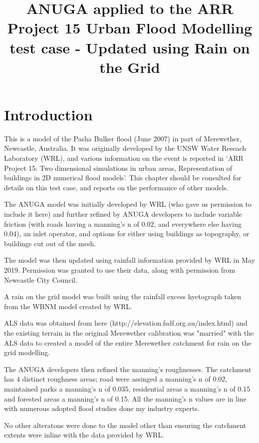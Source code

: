\documentclass{article}
\begin{document}
\title{ANUGA applied to the ARR Project 15 Urban Flood Modelling test case 
- Updated using Rain on the Grid}

\maketitle

\section{Introduction}
This is a model of the Pasha Bulker flood (June 2007) in part of Merewether,
Newcastle, Australia. It was originally developed by the UNSW Water Reseach Laboratory (WRL),
and various information on the event is reported in `ARR Project 15: Two
dimensional simulations in urban areas, Representation of buildings in 2D
numerical flood models'. This chapter should be consulted for details on this
test case, and reports on the performance of other models. 

The ANUGA model was initially developed by WRL (who gave us permission to
include it here) and further refined by ANUGA developers to include variable
friction (with roads having a manning's n of 0.02, and everywhere else having
0.04), an inlet operator, and options for either using buildings as topography, or
buildings cut out of the mesh.

The model was then updated using rainfall information provided by WRL in May 2019. 
Permission was granted to use their data, along with permission from Newcastle City Council.

A rain on the grid model was built using the rainfall excess hyetograph taken from
the WBNM model created by WRL. 

ALS data was obtained from here (http://elevation.fsdf.org.au/index.html) and the existing
terrain in the original Merewether calibration was "married" with the ALS data to created a 
model of the entire Merewether catchment for rain on the grid modelling.

The ANUGA developers then refined the manning's roughnesses. The catchment has 4
distinct roughness areas; road were assinged a manning's n of 0.02, maintained parks
a manning's n of 0.035, residential areas a manning's n of 0.15 and forested areas
a manning's n of 0.15. All the manning's n values are in line with numerous adopted flood studies
done my industry experts.

No other alteratons were done to the model other than ensuring the catchment extents were 
inline with the data provided by WRL.
 
\end{document}

